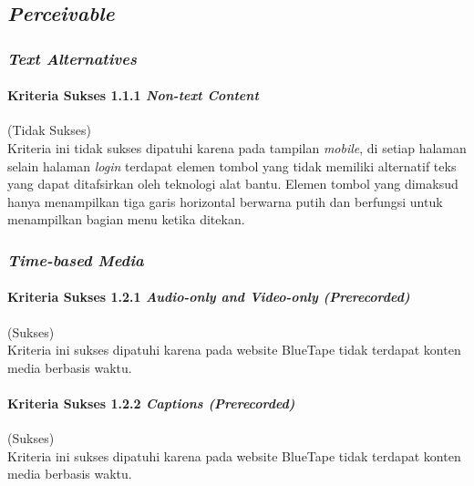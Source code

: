 \subsection{\textit{Perceivable}}
\label{subsec:kepatuhan_bluetape_perceivable}

\subsubsection{\textit{Text Alternatives}}
\label{subsubsec:kepatuhan_bluetape_text_alternatives}

\paragraph{Kriteria Sukses 1.1.1 \textit{Non-text Content}}
\label{par:kepatuhan_bluetape_kriteria_sukses_1.1.1}
(Tidak Sukses)\\

Kriteria ini tidak sukses dipatuhi karena pada tampilan \textit{mobile}, di setiap halaman selain halaman \textit{login} terdapat elemen tombol yang tidak memiliki alternatif teks yang dapat ditafsirkan oleh teknologi alat bantu. Elemen tombol yang dimaksud hanya menampilkan tiga garis horizontal berwarna putih dan berfungsi untuk menampilkan bagian menu ketika ditekan.

\subsubsection{\textit{Time-based Media}}
\label{subsubsec:kepatuhan_bluetape_time_based_media}

\paragraph{Kriteria Sukses 1.2.1 \textit{Audio-only and Video-only (Prerecorded)}}
\label{par:kepatuhan_bluetape_kriteria_sukses_1.2.1}
(Sukses)\\

Kriteria ini sukses dipatuhi karena pada website BlueTape tidak terdapat konten media berbasis waktu.

\paragraph{Kriteria Sukses 1.2.2 \textit{Captions (Prerecorded)}}
\label{par:kepatuhan_bluetape_kriteria_sukses_1.2.2}
(Sukses)\\

Kriteria ini sukses dipatuhi karena pada website BlueTape tidak terdapat konten media berbasis waktu.

